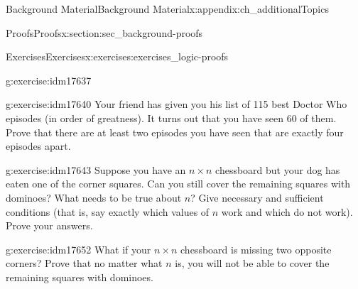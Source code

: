\documentclass[oneside,10pt,]{book}
\numberwithin{equation}{chapter}
\begin{document}
\begin{appendixptx}{Background Material}{}{Background Material}{}{}{x:appendix:ch_additionalTopics}
\begin{sectionptx}{Proofs}{}{Proofs}{}{}{x:section:sec_background-proofs}
\begin{exercises-subsection}{Exercises}{}{Exercises}{}{}{x:exercises:exercises_logic-proofs}
\begin{divisionexercise}{17}{}{}{g:exercise:idm17637}
\end{divisionexercise}%
\begin{divisionexercise}{18}{}{}{g:exercise:idm17640}%
Your friend has given you his list of 115 best Doctor Who episodes (in order of greatness).  It turns out that you have seen 60 of them.  Prove that there are at least two episodes you have seen that are exactly four episodes apart.%
\end{divisionexercise}%
\begin{divisionexercise}{19}{}{}{g:exercise:idm17643}%
Suppose you have an \(n\times n\) chessboard but your dog has eaten one of the corner squares. Can you still cover the remaining squares with dominoes? What needs to be true about \(n\)? Give necessary and sufficient conditions (that is, say exactly which values of \(n\) work and which do not work). Prove your answers.%
\begin{sidebyside}{1}{0.4}{0.4}{0}%
\begin{sbspanel}{0.2}%
%
\end{sbspanel}%
\end{sidebyside}%
\end{divisionexercise}%
\begin{divisionexercise}{20}{}{}{g:exercise:idm17652}%
What if your \(n\times n\) chessboard is missing two opposite corners? Prove that no matter what \(n\) is, you will not be able to cover the remaining squares with dominoes.%
\begin{sidebyside}{1}{0.4}{0.4}{0}%
\begin{sbspanel}{0.2}%
%
\end{sbspanel}%

\end{sidebyside}
\end{divisionexercise}
\end{exercises-subsection}
\end{sectionptx}
\end{appendixptx}
\end{document}
